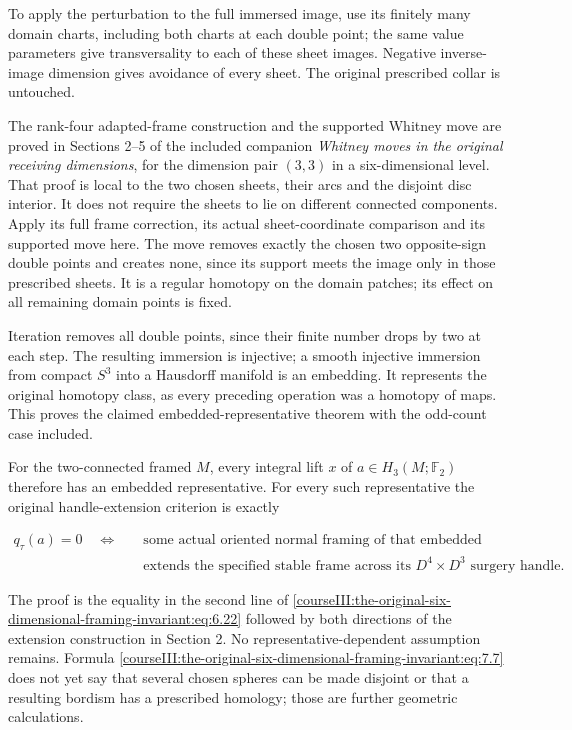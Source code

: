 To apply the perturbation to the full immersed image, use its finitely many domain charts, including both charts at each double point; the same value parameters give transversality to each of these sheet images. Negative inverse-image dimension gives avoidance of every sheet. The original prescribed collar is untouched.

The rank-four adapted-frame construction and the supported Whitney move are proved in Sections 2--5 of the included companion \emph{Whitney moves in the original receiving dimensions}, for the dimension pair \((3,3)\) in a six-dimensional level. That proof is local to the two chosen sheets, their arcs and the disjoint disc interior. It does not require the sheets to lie on different connected components. Apply its full frame correction, its actual sheet-coordinate comparison and its supported move here. The move removes exactly the chosen two opposite-sign double points and creates none, since its support meets the image only in those prescribed sheets. It is a regular homotopy on the domain patches; its effect on all remaining domain points is fixed.

Iteration removes all double points, since their finite number drops by two at each step. The resulting immersion is injective; a smooth injective immersion from compact \(S^3\) into a Hausdorff manifold is an embedding. It represents the original homotopy class, as every preceding operation was a homotopy of maps. This proves the claimed embedded-representative theorem with the odd-count case included.

For the two-connected framed \(M\), every integral lift \(x\) of \(a\in H_3(M;\mathbb F_2)\) therefore has an embedded representative. For every such representative the original handle-extension criterion is exactly

\begin{equation}
\begin{split}
 q_\tau(a)=0
 \quad\Longleftrightarrow\quad&
 \text{some actual oriented normal framing of that embedded sphere}\\[-2pt]
 &\text{extends the specified stable frame across its }D^4\times D^3
   \text{ surgery handle.}
 \end{split}
 \label{courseIII:the-original-six-dimensional-framing-invariant:eq:7.7}
\end{equation}

The proof is the equality in the second line of \eqref{courseIII:the-original-six-dimensional-framing-invariant:eq:6.22} followed by both directions of the extension construction in Section 2. No representative-dependent assumption remains. Formula \eqref{courseIII:the-original-six-dimensional-framing-invariant:eq:7.7} does not yet say that several chosen spheres can be made disjoint or that a resulting bordism has a prescribed homology; those are further geometric calculations.

